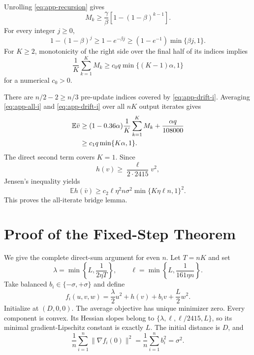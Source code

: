 \documentclass[twoside]{article}
\newcommand{\E}{\mathbb E}
\begin{document}
Unrolling \eqref{eq:app-recursion} gives
\begin{equation}
 M_k\ge\frac{\gamma}{\beta}
 \left[1-(1-\beta)^{k-1}\right].                    \label{eq:app-unroll}
\end{equation}
For every integer $j\ge0$,
\begin{equation}
 1-(1-\beta)^j\ge1-e^{-\beta j}
 \ge(1-e^{-1})\min\{\beta j,1\}.                   \label{eq:app-geometric}
\end{equation}
For $K\ge2$, monotonicity of the right side over the final half of its indices
implies
\begin{equation}
 \frac1K\sum_{k=1}^KM_k
 \ge c_0q\min\{(K-1)\alpha,1\}                     \label{eq:app-average-M}
\end{equation}
for a numerical $c_0>0$.

There are $n/2-2\ge n/3$ pre-update indices covered by
\eqref{eq:app-drift-i}. Averaging \eqref{eq:app-all-i} and
\eqref{eq:app-drift-i} over all $nK$ output iterates gives
\begin{align}
 \E\bar v
 &\ge(1-0.36\alpha)\frac1K\sum_{k=1}^KM_k
 +\frac{\alpha q}{108000}\notag\\
 &\ge c_1q\min\{K\alpha,1\}.                       \label{eq:app-final-mean}
\end{align}
The direct second term covers $K=1$. Since
\begin{equation}
 h(v)\ge\frac{\ell}{2\cdot2415}v^2,
 \label{eq:app-strong}
\end{equation}
Jensen's inequality yields
\begin{equation}
 \E h(\bar v)
 \ge c_2\ell\eta^2n\sigma^2
 \min\{K\eta\ell n,1\}^2.                          \label{eq:app-final-risk}
\end{equation}
This proves the all-iterate bridge lemma.

\section{Proof of the Fixed-Step Theorem}
\label{app:fixed}

We give the complete direct-sum argument for even $n$. Let $T=nK$ and set
\begin{equation}
 \lambda=\min\left\{L,\frac{1}{2\eta T}\right\},
 \qquad
 \ell=\min\left\{L,\frac{1}{161\eta n}\right\}.
 \label{eq:app-curvatures}
\end{equation}
Take balanced $b_i\in\{-\sigma,+\sigma\}$ and define
\begin{equation}
 f_i(u,v,w)=\frac\lambda2u^2+h(v)+b_iv+\frac L2w^2.
 \label{eq:app-hard}
\end{equation}
Initialize at $(D,0,0)$. The average objective has unique minimizer zero.
Every component is convex. Its Hessian slopes belong to
$\{\lambda,\ell,\ell/2415,L\}$, so its minimal gradient-Lipschitz constant is
exactly $L$. The initial distance is $D$, and
\begin{equation}
 \frac1n\sum_{i=1}^n\lVert\nabla f_i(0)\rVert^2
 =\frac1n\sum_{i=1}^nb_i^2=\sigma^2.                \label{eq:app-exact-sigma}
\end{equation}
\end{document}
